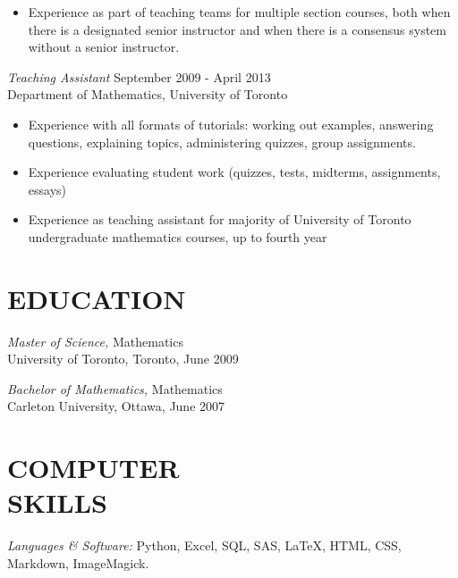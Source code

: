 \documentclass[margin, 10pt]{res} %
\begin{document}
\begin{resume}
\begin{itemize}
\item Experience as part of teaching teams for multiple section courses, both when there is a designated senior instructor and when there is a consensus system without a senior instructor.

\end{itemize}
 
{\sl Teaching Assistant} \hfill September 2009 - April 2013 \\
Department of Mathematics, University of Toronto

\begin{itemize} 
\item Experience with all formats of tutorials: working out examples, answering questions, explaining topics, administering quizzes, group assignments.
\item Experience evaluating student work (quizzes, tests, midterms, assignments, essays)
\item Experience as teaching assistant for majority of University of Toronto undergraduate mathematics courses, up to fourth year
\end{itemize} 


\section{EDUCATION}

{\sl Master of Science,} Mathematics \\
University of Toronto, Toronto, June 2009

{\sl Bachelor of Mathematics,} Mathematics \\
Carleton University, Ottawa, June 2007





\section{COMPUTER \\ SKILLS} 

{\sl Languages \& Software:} 
Python, Excel, SQL, SAS, \LaTeX{}, HTML, CSS, Markdown, ImageMagick. \\


\end{resume}
\end{document}
